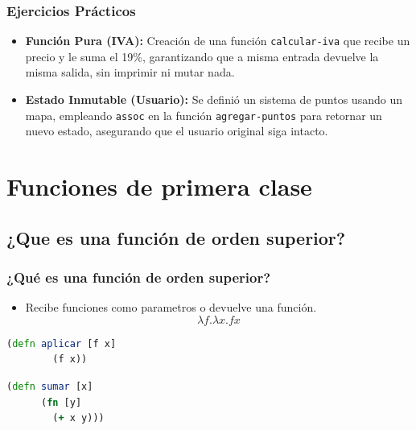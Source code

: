 \documentclass{beamer}
\begin{document}
\begin{frame}
\frametitle{Ejercicios Prácticos}
\begin{itemize}
    \item \textbf{Función Pura (IVA):} Creación de una función \texttt{calcular-iva} que recibe un precio y le suma el 19\%, garantizando que a misma entrada devuelve la misma salida, sin imprimir ni mutar nada.
    \item \textbf{Estado Inmutable (Usuario):} Se definió un sistema de puntos usando un mapa, empleando \texttt{assoc} en la función \texttt{agregar-puntos} para retornar un nuevo estado, asegurando que el usuario original siga intacto.
\end{itemize}
\end{frame}

\section{ Funciones de primera clase }

\subsection{¿Que es una función de orden superior?}

\begin{frame}[fragile]
    \frametitle{¿Qué es una función de orden superior?}
    \begin{itemize}
        \item Recibe funciones como parametros o devuelve una función.
        $$
        \lambda f.\lambda x. fx
        $$
    \end{itemize}
    \begin{center}
    \begin{minipage}{0.4\textwidth}
        \begin{lstlisting}[language=Clojure]
    (defn aplicar [f x]
        (f x))
        \end{lstlisting}
    \end{minipage}
    \begin{minipage}{0.4\textwidth}
    
    \begin{lstlisting}[language=Clojure]
    (defn sumar [x]
      (fn [y]
        (+ x y)))
    \end{lstlisting}
    
    \end{minipage}
        
    \end{center}
    
    
\end{frame}
\end{document}
